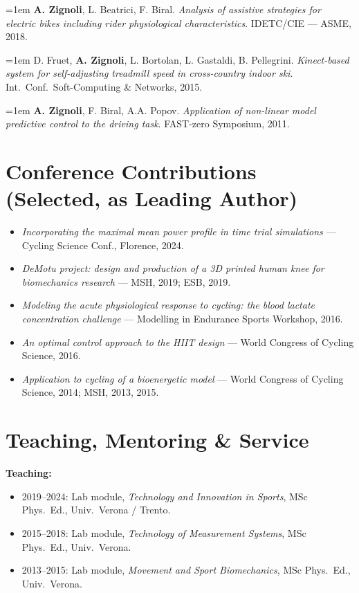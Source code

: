 \documentclass[10pt,a4paper]{article}
\newcommand{\pub}[3]{%
  \hangindent=1em\hangafter=1
  \small #1. \textit{#2}. #3.\par\vspace{3pt}%
}
\begin{document}
\pub{\textbf{A. Zignoli}, L. Beatrici, F. Biral}{Analysis of assistive strategies for electric bikes including rider physiological characteristics}{IDETC/CIE — ASME, 2018}

\pub{D. Fruet, \textbf{A. Zignoli}, L. Bortolan, L. Gastaldi, B. Pellegrini}{Kinect-based system for self-adjusting treadmill speed in cross-country indoor ski}{Int.\ Conf.\ Soft-Computing \& Networks, 2015}

\pub{\textbf{A. Zignoli}, F. Biral, A.A. Popov}{Application of non-linear model predictive control to the driving task}{FAST-zero Symposium, 2011}

\section{Conference Contributions (Selected, as Leading Author)}

\begin{itemize}
  \item \textit{Incorporating the maximal mean power profile in time trial simulations} — Cycling Science Conf., Florence, 2024.
  \item \textit{DeMotu project: design and production of a 3D printed human knee for biomechanics research} — MSH, 2019; ESB, 2019.
  \item \textit{Modeling the acute physiological response to cycling: the blood lactate concentration challenge} — Modelling in Endurance Sports Workshop, 2016.
  \item \textit{An optimal control approach to the HIIT design} — World Congress of Cycling Science, 2016.
  \item \textit{Application to cycling of a bioenergetic model} — World Congress of Cycling Science, 2014; MSH, 2013, 2015.
\end{itemize}

\section{Teaching, Mentoring \& Service}

\textbf{Teaching:}
\begin{itemize}
  \item 2019–2024: Lab module, \textit{Technology and Innovation in Sports}, MSc Phys.\ Ed., Univ.\ Verona / Trento.
  \item 2015–2018: Lab module, \textit{Technology of Measurement Systems}, MSc Phys.\ Ed., Univ.\ Verona.
  \item 2013–2015: Lab module, \textit{Movement and Sport Biomechanics}, MSc Phys.\ Ed., Univ.\ Verona.
\end{itemize}
\end{document}
